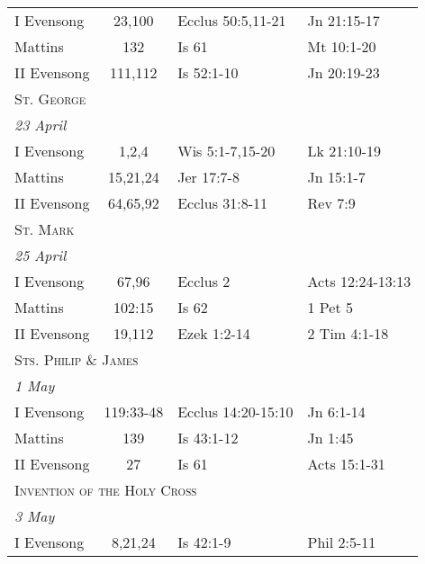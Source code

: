 \begin{longtable}{l c l l}
\hspace{1em} I Evensong&23,100&Ecclus 50:5,11-21&Jn 21:15-17\\
\hspace{1em} Mattins&132&Is 61&Mt 10:1-20\\
\hspace{1em} II Evensong&111,112&Is 52:1-10&Jn 20:19-23\\
\multicolumn{4}{l}{\textsc{St. George}}\\
\multicolumn{4}{l}{\textit{23 April}}\\
\hspace{1em} I Evensong&1,2,4&Wis 5:1-7,15-20&Lk 21:10-19\\
\hspace{1em} Mattins&15,21,24&Jer 17:7-8&Jn 15:1-7\\
\hspace{1em} II Evensong&64,65,92&Ecclus 31:8-11&Rev 7:9\\
\multicolumn{4}{l}{\textsc{St. Mark}}\\
\multicolumn{4}{l}{\textit{25 April}}\\
\hspace{1em} I Evensong&67,96&Ecclus 2&Acts 12:24-13:13\\
\hspace{1em} Mattins&102:15&Is 62&1 Pet 5\\
\hspace{1em} II Evensong&19,112&Ezek 1:2-14&2 Tim 4:1-18\\
\multicolumn{4}{l}{\textsc{Sts. Philip \& James}}\\
\multicolumn{4}{l}{\textit{1 May}}\\
\hspace{1em} I Evensong&119:33-48&Ecclus 14:20-15:10&Jn 6:1-14\\
\hspace{1em} Mattins&139&Is 43:1-12&Jn 1:45\\
\hspace{1em} II Evensong&27&Is 61&Acts 15:1-31\\
\multicolumn{4}{l}{\textsc{Invention of the Holy Cross}}\\
\multicolumn{4}{l}{\textit{3 May}}\\
\hspace{1em} I Evensong&8,21,24&Is 42:1-9&Phil 2:5-11\\

\end{longtable}
